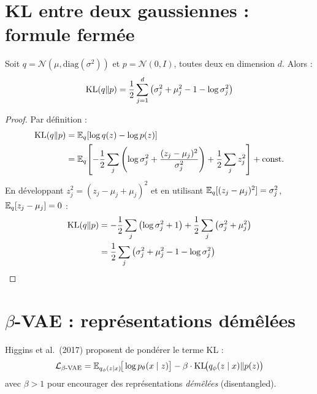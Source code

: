 \section{KL entre deux gaussiennes : formule ferm\'ee}
\label{sec:kl-gaussians}

\begin{theoreme}
Soit $q = \mathcal{N}(\mu, \text{diag}(\sigma^2))$ et $p = \mathcal{N}(0, I)$, toutes deux en dimension $d$. Alors :
\begin{equation}
\mathrm{KL}(q \| p) = \frac{1}{2}\sum_{j=1}^{d} \left(\sigma_j^2 + \mu_j^2 - 1 - \log \sigma_j^2\right)
\label{eq:kl-closed-form}
\end{equation}
\end{theoreme}

\begin{proof}
Par d\'efinition :
\begin{align}
\mathrm{KL}(q \| p) &= \mathbb{E}_q\!\left[\log q(z) - \log p(z)\right] \\
&= \mathbb{E}_q\!\left[-\frac{1}{2}\sum_j \left(\log \sigma_j^2 + \frac{(z_j - \mu_j)^2}{\sigma_j^2}\right) + \frac{1}{2}\sum_j z_j^2\right] + \text{const.}
\end{align}
En d\'eveloppant $z_j^2 = (z_j - \mu_j + \mu_j)^2$ et en utilisant $\mathbb{E}_q[(z_j - \mu_j)^2] = \sigma_j^2$, $\mathbb{E}_q[z_j - \mu_j] = 0$ :
\begin{align}
\mathrm{KL}(q \| p) &= -\frac{1}{2}\sum_j \left(\log \sigma_j^2 + 1\right) + \frac{1}{2}\sum_j \left(\sigma_j^2 + \mu_j^2\right) \\
&= \frac{1}{2}\sum_j \left(\sigma_j^2 + \mu_j^2 - 1 - \log \sigma_j^2\right)
\end{align}
\end{proof}

\section{$\beta$-VAE : repr\'esentations d\'em\^el\'ees}
\label{sec:beta-vae}

\begin{definition}
Higgins et al.\ (2017) proposent de pondérer le terme KL :
\begin{equation}
\mathcal{L}_{\beta\text{-VAE}} = \mathbb{E}_{q_\phi(z|x)}\!\big[\log p_\theta(x \mid z)\big] - \beta \cdot \mathrm{KL}\!\big(q_\phi(z \mid x) \| p(z)\big)
\label{eq:beta-vae}
\end{equation}
avec $\beta > 1$ pour encourager des repr\'esentations \emph{d\'em\^el\'ees} (disentangled).
\end{definition}

